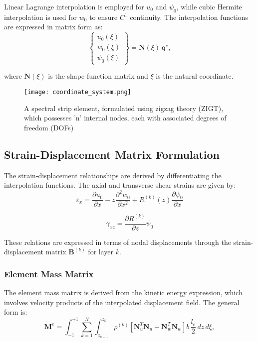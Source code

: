 \documentclass[12pt,a4paper]{report}
\begin{document}
Linear Lagrange interpolation is employed for $u_0$ and $\psi_0$, while cubic Hermite interpolation is used for $w_0$ to ensure $C^1$ continuity. The interpolation functions are expressed in matrix form as:
\begin{equation}
   \begin{Bmatrix} u_0(\xi) \\ w_0(\xi) \\ \psi_0(\xi) \end{Bmatrix} 
= \mathbf{N}(\xi) \, \mathbf{q}^e,
\end{equation}

where $\mathbf{N}(\xi)$ is the shape function matrix and $\xi$ is the natural coordinate.

\begin{figure}[htbp]
\centering
\texttt{[image: coordinate\_system.png]}
\caption{A spectral strip element, formulated using zigzag theory (ZIGT), which possesses 'n' internal nodes, each with associated degrees of freedom (DOFs)}
\label{fig:coordinate_system}
\end{figure}

\subsection*{Strain-Displacement Matrix Formulation}

The strain-displacement relationships are derived by differentiating the interpolation functions. The axial and transverse shear strains are given by:
\begin{equation}
    \varepsilon_x = \frac{\partial u_0}{\partial x} - z \frac{\partial^2 w_0}{\partial x^2} + R^{(k)}(z)\frac{\partial \psi_0}{\partial x}
\end{equation}

\begin{equation}
    \gamma_{xz} = \frac{\partial R^{(k)}}{\partial z} \psi_0 
\end{equation}


These relations are expressed in terms of nodal displacements through the strain-displacement matrix $\mathbf{B}^{(k)}$ for layer $k$.

\subsubsection*{Element Mass Matrix}

The element mass matrix is derived from the kinetic energy expression, which involves velocity products of the interpolated displacement field. The general form is:
\begin{equation}
    \mathbf{M}^e = \int_{-1}^{+1} \sum_{k=1}^{N} \int_{z_{k-1}}^{z_k} 
\rho^{(k)} \left[ \mathbf{N}_u^T \mathbf{N}_u + \mathbf{N}_w^T \mathbf{N}_w \right] b \, \frac{l_e}{2} \, dz \, d\xi,
\end{equation}
\end{document}
